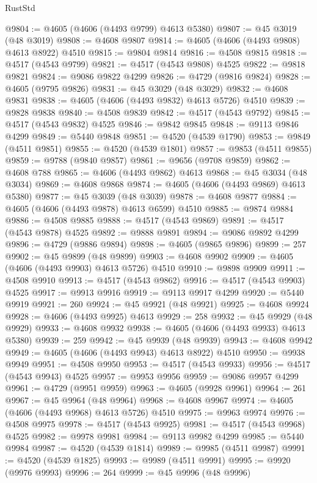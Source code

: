 \begin{lexlean}{RustStd}
\begin{coremodule}
@9804 := @4605 (@4606 (@4493 @9799) @4613 @5380)
@9807 := @45 @3019 (@48 @3019)
@9808 := @4608 @9807
@9814 := @4605 (@4606 (@4493 @9808) @4613 @8922) @4510
@9815 := @9804 @9814
@9816 := @4508 @9815
@9818 := @4517 (@4543 @9799)
@9821 := @4517 (@4543 @9808) @4525
@9822 := @9818 @9821
@9824 := @9086 @9822 @4299
@9826 := @4729 (@9816 @9824)
@9828 := @4605 (@9795 @9826)
@9831 := @45 @3029 (@48 @3029)
@9832 := @4608 @9831
@9838 := @4605 (@4606 (@4493 @9832) @4613 @5726) @4510
@9839 := @9828 @9838
@9840 := @4508 @9839
@9842 := @4517 (@4543 @9792)
@9845 := @4517 (@4543 @9832) @4525
@9846 := @9842 @9845
@9848 := @9113 @9846 @4299
@9849 := @5440 @9848
@9851 := @4520 (@4539 @1790)
@9853 := @9849 (@4511 @9851)
@9855 := @4520 (@4539 @1801)
@9857 := @9853 (@4511 @9855)
@9859 := @9788 (@9840 @9857)
@9861 := @9656 (@9708 @9859)
@9862 := @4608 @788
@9865 := @4606 (@4493 @9862) @4613
@9868 := @45 @3034 (@48 @3034)
@9869 := @4608 @9868
@9874 := @4605 (@4606 (@4493 @9869) @4613 @5380)
@9877 := @45 @3039 (@48 @3039)
@9878 := @4608 @9877
@9884 := @4605 (@4606 (@4493 @9878) @4613 @6599) @4510
@9885 := @9874 @9884
@9886 := @4508 @9885
@9888 := @4517 (@4543 @9869)
@9891 := @4517 (@4543 @9878) @4525
@9892 := @9888 @9891
@9894 := @9086 @9892 @4299
@9896 := @4729 (@9886 @9894)
@9898 := @4605 (@9865 @9896)
@9899 := 257
@9902 := @45 @9899 (@48 @9899)
@9903 := @4608 @9902
@9909 := @4605 (@4606 (@4493 @9903) @4613 @5726) @4510
@9910 := @9898 @9909
@9911 := @4508 @9910
@9913 := @4517 (@4543 @9862)
@9916 := @4517 (@4543 @9903) @4525
@9917 := @9913 @9916
@9919 := @9113 @9917 @4299
@9920 := @5440 @9919
@9921 := 260
@9924 := @45 @9921 (@48 @9921)
@9925 := @4608 @9924
@9928 := @4606 (@4493 @9925) @4613
@9929 := 258
@9932 := @45 @9929 (@48 @9929)
@9933 := @4608 @9932
@9938 := @4605 (@4606 (@4493 @9933) @4613 @5380)
@9939 := 259
@9942 := @45 @9939 (@48 @9939)
@9943 := @4608 @9942
@9949 := @4605 (@4606 (@4493 @9943) @4613 @8922) @4510
@9950 := @9938 @9949
@9951 := @4508 @9950
@9953 := @4517 (@4543 @9933)
@9956 := @4517 (@4543 @9943) @4525
@9957 := @9953 @9956
@9959 := @9086 @9957 @4299
@9961 := @4729 (@9951 @9959)
@9963 := @4605 (@9928 @9961)
@9964 := 261
@9967 := @45 @9964 (@48 @9964)
@9968 := @4608 @9967
@9974 := @4605 (@4606 (@4493 @9968) @4613 @5726) @4510
@9975 := @9963 @9974
@9976 := @4508 @9975
@9978 := @4517 (@4543 @9925)
@9981 := @4517 (@4543 @9968) @4525
@9982 := @9978 @9981
@9984 := @9113 @9982 @4299
@9985 := @5440 @9984
@9987 := @4520 (@4539 @1814)
@9989 := @9985 (@4511 @9987)
@9991 := @4520 (@4539 @1825)
@9993 := @9989 (@4511 @9991)
@9995 := @9920 (@9976 @9993)
@9996 := 264
@9999 := @45 @9996 (@48 @9996)

\end{coremodule}
\end{lexlean}
